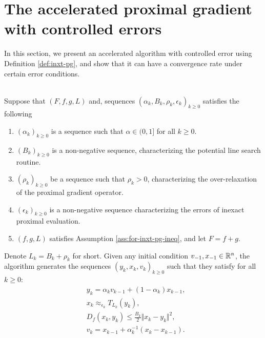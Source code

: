 \documentclass[12pt]{article}
\begin{document}
\section{The accelerated proximal gradient with controlled errors}
    In this section, we present an accelerated algorithm with controlled error using Definition \ref{def:inxt-pg}, and show that it can have a convergence rate under certain error conditions. 
    \begin{definition}\;\label{def:inxt-apg}\\
        Suppose that $(F, f, g, L)$ and, sequences $(\alpha_k, B_k, \rho_k, \epsilon_k)_{k \ge 0}$ satisfies the following
        \begin{enumerate}[nosep]
            \item $(\alpha_k)_{k \ge 0}$ is a sequence such that $\alpha \in (0, 1]$ for all $k \ge 0$. 
            \item $(B_k)_{k \ge 0}$ is a non-negative sequence, characterizing the potential line search routine. 
            \item $(\rho_k)_{k \ge 0}$ be a sequence such that $\rho_k > 0$, characterizing the over-relaxation of the proximal gradient operator. 
            \item $(\epsilon_k)_{k \ge 0}$ is a non-negative sequence characterizing the errors of inexact proximal evaluation.
            \item $(f, g, L)$ satisfies Assumption \ref{ass:for-inxt-pg-ineq}, and let $F = f + g$. 
        \end{enumerate}
        Denote $L_k = B_k + \rho_k$ for short. 
        Given any initial condition $v_{-1}, x_{-1} \in \mathbb R^n$, the algorithm generates the sequences $(y_k, x_k, v_k)_{k \ge 0}$ such that they satisfy for all $k \ge 0$: 
        \begin{align*}
            & y_k = \alpha_k v_{k - 1} + (1 - \alpha_k)x_{k - 1}, 
            \\
            & x_k \approx_{\epsilon_k} T_{L_k}(y_k), 
            \\
            & D_f(x_k, y_k) \le \frac{B_k}{2}\Vert x_k - y_k\Vert^2, 
            \\
            & v_k = x_{k - 1} + \alpha_k^{-1}(x_k - x_{k - 1}). 
        \end{align*}
    \end{definition}
\end{document}
